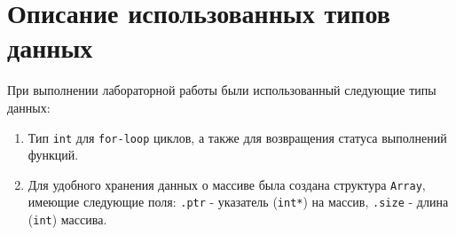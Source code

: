\section{Описание использованных типов данных}

При выполнении лабораторной работы были использованный следующие типы данных:
\begin{enumerate}
    \item Тип \texttt{int} для \texttt{for-loop} циклов, а также для возвращения статуса выполнений функций.
    \item Для удобного хранения данных о массиве была создана структура \texttt{Array},
    имеющие следующие поля: \texttt{.ptr} - указатель (\texttt{int*}) на массив,
    \texttt{.size} - длина (\texttt{int}) массива.
\end{enumerate}

